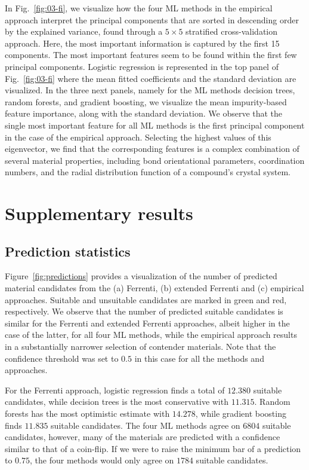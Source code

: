 \documentclass[superscriptaddress,unsortedaddress,
 amsmath,amssymb,
 aps,
]{revtex4-2}
\begin{document}
In Fig.~\ref{fig:03-fi}, we visualize how the four  ML methods in the empirical approach interpret the principal components that are sorted in descending order by the explained variance, found through a $5\times 5$ stratified cross-validation approach.  
Here, the most important information is captured by the first 15 components. The most important features seem to be found within the first few principal  components. 
Logistic regression is represented in the top panel of Fig.~\ref{fig:03-fi} where the mean fitted coefficients and the standard deviation are visualized. In the three next panels, namely for the ML methods decision trees, random forests, and gradient boosting, we visualize the mean impurity-based feature importance, along with the standard deviation. We observe that the single most important feature for all ML methods is the first principal component in the case of the empirical approach. Selecting the highest values of this eigenvector, we find that the corresponding features is a complex combination of several material properties, including bond orientational parameters, coordination numbers, and the radial distribution function of a compound's crystal system. 




\section*{Supplementary results} 

\subsection*{Prediction statistics}

Figure~\ref{fig:predictions} provides a visualization of the number of predicted material candidates from the (a) Ferrenti, (b) extended Ferrenti and (c) empirical approaches. Suitable and unsuitable candidates are marked in green and red, respectively. We observe that the number of predicted suitable candidates is similar for the Ferrenti and extended Ferrenti approaches, albeit higher in the case of the latter, for all four ML methods, while the empirical approach results in a substantially narrower selection of contender materials.
Note that the confidence threshold was set to $0.5$ in this case for all the methods and approaches. 

For the Ferrenti approach, logistic regression finds a total of $12.380$ suitable candidates, while decision trees is the most conservative with $11.315$. Random forests has the most optimistic estimate with $14.278$, while gradient boosting finds $11.835$ suitable candidates. The four ML methods agree on $6804$ suitable candidates,  however, many of the materials are predicted with a confidence similar to that of a coin-flip.
If we were to raise the minimum bar of a prediction to $0.75$, the four methods would only agree on $1784$ suitable candidates. 
\end{document}

